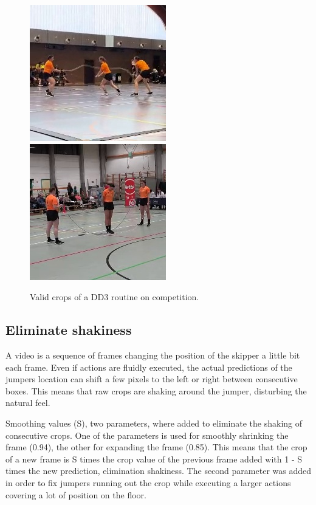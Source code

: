 \begin{figure}
    \centering
    \includegraphics[width=0.45\linewidth]{img/1315_2935}
    \includegraphics[width=0.45\linewidth]{img/2297_134}
    \label{fig:dd3-crop}
    \caption[Valid crops of a DD3 routine on competition.]{Valid crops of a DD3 routine on competition.}
\end{figure}

\subsection{Eliminate shakiness}

A video is a sequence of frames changing the position of the skipper a little bit each frame. Even if actions are fluidly executed, the actual predictions of the jumpers location can shift a few pixels to the left or right between consecutive boxes. This means that raw crops are shaking around the jumper, disturbing the natural feel.

Smoothing values (S), two parameters, where added to eliminate the shaking of consecutive crops. One of the parameters is used for smoothly shrinking the frame (0.94), the other for expanding the frame (0.85).
This means that the crop of a new frame is S times the crop value of the previous frame added with 1 - S times the new prediction, elimination shakiness. The second parameter was added in order to fix jumpers running out the crop while executing a larger actions covering a lot of position on the floor.

